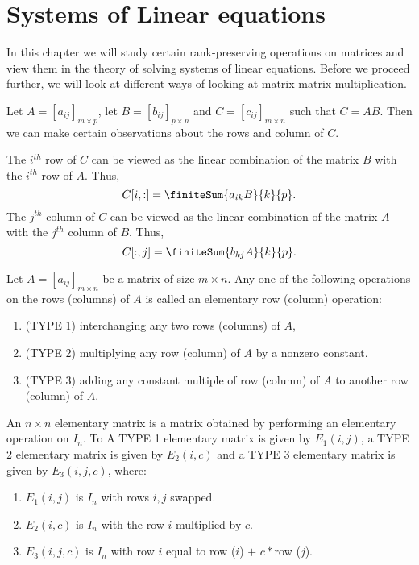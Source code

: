 \chapter{Systems of Linear equations}

In this chapter we will study certain rank-preserving operations on matrices and view them in the theory of
solving systems of linear equations. Before we proceed further, we will look at different ways of looking at
matrix-matrix multiplication.

Let $A = {\left[a_{ij}\right]}_{m\times p}$, let $B = {\left[b_{ij}\right]}_{p \times n}$ and 
$C = {\left[c_{ij}\right]}_{m \times n}$ such that $C = AB$. Then we can make certain observations about the rows
and column of $C$.
\begin{Remark}
    The $i^{th}$ row of $C$ can be viewed as the linear combination of the matrix $B$ with the $i^{th}$ row of
    $A$. Thus,
    \[C[i,:] = \finiteSum{a_{ik}B}{k}{p}.\]
    The $j^{th}$ column of $C$ can be viewed as the linear combination of the matrix $A$ with the $j^{th}$
    column of $B$. Thus,
    \[C[:,j] = \finiteSum{b_{kj}A}{k}{p}.\]
\end{Remark}
\begin{Definition}[name = Elementary operations]
    Let $A = {\left[a_{ij}\right]}_{m\times n}$ be a matrix of size $m\times n$. Any one of the following
    operations on the rows (columns) of $A$ is called an elementary row (column) operation:
    \begin{enumerate}
	\item (TYPE 1) interchanging any two rows (columns) of $A$,
	\item (TYPE 2) multiplying any row (column) of $A$ by a nonzero constant.
	\item (TYPE 3) adding any constant multiple of row (column) of $A$ to another row (column) of $A$.
    \end{enumerate}
\end{Definition}
\begin{Definition}[name = Elementary matrix]
    An $n\times n$ elementary matrix is a matrix obtained by performing an elementary operation on $I_n$. To
    A TYPE 1 elementary matrix is given by $E_1(i,j)$, a TYPE 2 elementary matrix is given by $E_2(i,c)$ and a
    TYPE 3 elementary matrix is given by $E_3(i,j,c)$, where:
    \begin{enumerate}
	\item
	    $E_1(i,j)$ is $I_n$ with rows $i,j$ swapped.
	\item
	    $E_2(i,c)$ is $I_n$ with the row $i$ multiplied by $c$.
	\item
	    $E_3(i,j,c)$ is $I_n$ with row $i$ equal to row ($i$) $+$ $c*$row ($j$). 
    \end{enumerate}
\end{Definition}
